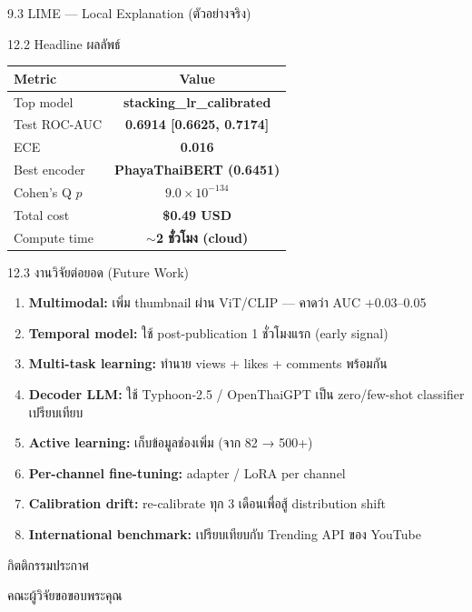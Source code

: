 \documentclass[aspectratio=169,11pt,xcolor=dvipsnames]{beamer}
\newcommand{\hl}[1]{\textcolor{kmitlOrange}{\textbf{#1}}}
\newcommand{\hlb}[1]{\textcolor{kmitlBlue}{\textbf{#1}}}
\begin{document}
\begin{frame}{9.3 LIME — Local Explanation (ตัวอย่างจริง)}
\begin{center}
\begin{frame}{12.2 Headline ผลลัพธ์}
  \begin{center}
    \Large
    \begin{tabular}{lc}
      \toprule
      \textbf{Metric} & \textbf{Value}\\
      \midrule
      Top model     & \hl{stacking\_lr\_calibrated}\\
      Test ROC-AUC  & \hl{0.6914 [0.6625, 0.7174]}\\
      ECE           & \hl{0.016}\\
      Best encoder  & \hl{PhayaThaiBERT (0.6451)}\\
      Cohen's Q $p$ & \hl{$9.0 \times 10^{-134}$}\\
      Total cost    & \hl{\$0.49 USD}\\
      Compute time  & \hl{$\sim$2 ชั่วโมง (cloud)}\\
      \bottomrule
    \end{tabular}
  \end{center}
\end{frame}

\begin{frame}{12.3 งานวิจัยต่อยอด (Future Work)}
  \begin{enumerate}\setlength\itemsep{0.3em}
    \item \hlb{Multimodal:} เพิ่ม thumbnail ผ่าน ViT/CLIP — คาดว่า AUC $+$0.03--0.05
    \item \hlb{Temporal model:} ใช้ post-publication 1 ชั่วโมงแรก (early signal)
    \item \hlb{Multi-task learning:} ทำนาย views + likes + comments พร้อมกัน
    \item \hlb{Decoder LLM:} ใช้ Typhoon-2.5 / OpenThaiGPT เป็น zero/few-shot classifier เปรียบเทียบ
    \item \hlb{Active learning:} เก็บข้อมูลช่องเพิ่ม (จาก 82 → 500+)
    \item \hlb{Per-channel fine-tuning:} adapter / LoRA per channel
    \item \hlb{Calibration drift:} re-calibrate ทุก 3 เดือนเพื่อสู้ distribution shift
    \item \hlb{International benchmark:} เปรียบเทียบกับ Trending API ของ YouTube
  \end{enumerate}
\end{frame}

\begin{frame}{กิตติกรรมประกาศ}
  \begin{center}
    \large
    คณะผู้วิจัยขอขอบพระคุณ
    \vspace{0.6em}


\end{center}
\end{frame}
\end{center}
\end{frame}
\end{document}
